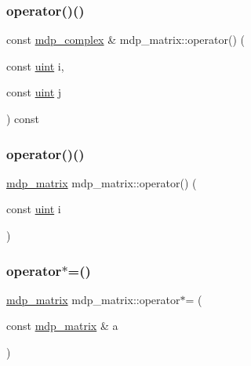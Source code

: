 \mbox{\label{classmdp__matrix_a0366837f0e176d30b42a7103da996b4e}} 
\subsubsection{\texorpdfstring{operator()()}{operator()()}\hspace{0.1cm}{\footnotesize\ttfamily [2/3]}}
{\footnotesize\ttfamily const \hyperlink{classmdp__complex}{mdp\+\_\+complex} \& mdp\+\_\+matrix\+::operator() (\begin{DoxyParamCaption}\item[{const \hyperlink{mdp__global__vars_8h_a91ad9478d81a7aaf2593e8d9c3d06a14}{uint}}]{i,  }\item[{const \hyperlink{mdp__global__vars_8h_a91ad9478d81a7aaf2593e8d9c3d06a14}{uint}}]{j }\end{DoxyParamCaption}) const\hspace{0.3cm}{\ttfamily [inline]}}

\mbox{\label{classmdp__matrix_aef809061e550a0587af45e098810c95e}} 
\subsubsection{\texorpdfstring{operator()()}{operator()()}\hspace{0.1cm}{\footnotesize\ttfamily [3/3]}}
{\footnotesize\ttfamily \hyperlink{classmdp__matrix}{mdp\+\_\+matrix} mdp\+\_\+matrix\+::operator() (\begin{DoxyParamCaption}\item[{const \hyperlink{mdp__global__vars_8h_a91ad9478d81a7aaf2593e8d9c3d06a14}{uint}}]{i }\end{DoxyParamCaption})\hspace{0.3cm}{\ttfamily [inline]}}

\mbox{\label{classmdp__matrix_a08052286856ff5fe01cc3cbad6553eb2}} 
\subsubsection{\texorpdfstring{operator$\ast$=()}{operator*=()}\hspace{0.1cm}{\footnotesize\ttfamily [1/3]}}
{\footnotesize\ttfamily \hyperlink{classmdp__matrix}{mdp\+\_\+matrix} mdp\+\_\+matrix\+::operator$\ast$= (\begin{DoxyParamCaption}\item[{const \hyperlink{classmdp__matrix}{mdp\+\_\+matrix} \&}]{a }\end{DoxyParamCaption})\hspace{0.3cm}{\ttfamily [inline]}}

